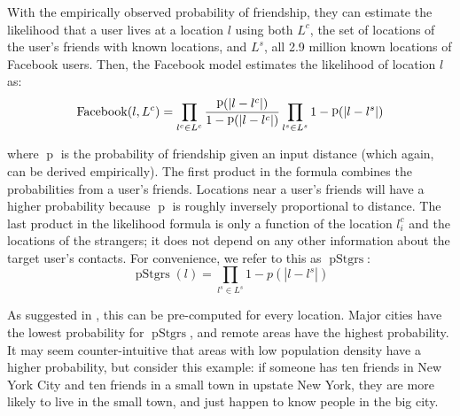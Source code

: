 \documentclass{sig-alternate}
\DeclareMathOperator{\pStrangers}{pStgrs}
\DeclareMathOperator{\Backstrom}{Facebook}
\DeclareMathOperator{\p}{p}
\begin{document}
With the empirically observed probability of friendship, they can estimate the
likelihood that a user lives at a location $l$ using both $L^c$, the set of
locations of the user's friends with known locations, and $L^s$, all 2.9
million known locations of Facebook users.
%
Then, the Facebook model estimates the likelihood of location $l$ as:
\[
    \Backstrom(l,L^c) =
        \prod_{l^c \in L^c} {\p(|l-l^c|) \over 1-\p(|l-l^c|) }
        \prod_{l^s \in L^s} 1-\p(|l-l^s|)
\]

\noindent where $\p$ is the probability of friendship given an input distance
(which again, can be derived empirically).
%
The first product in the formula combines the probabilities from a user's friends.
%
Locations near a user's friends will have a higher probability because $\p$ is
roughly inversely proportional to distance.
%
The last product in the likelihood formula is only a function of the location
$l^c_i$ and the locations of the strangers; it does not depend on any other
information about the target user's contacts.
%
For convenience, we refer to this as $\pStrangers$:
\[
    \pStrangers(l) = \prod_{l^s \in L^s}1-p(|l-l^s|)
\]

\noindent As suggested in \cite{backstrom2010find}, this can be pre-computed
for every location.
Major cities have the lowest probability for
$\pStrangers$, and remote areas have the highest probability.  It may seem
counter-intuitive that areas with low population density have a higher
probability, but consider this example: if someone has ten friends in New York
City and ten friends in a small town in upstate New York, they are more likely
to live in the small town, and just happen to know people in the big city.
\end{document}
